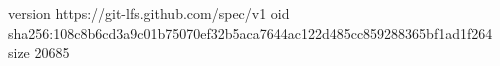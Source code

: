 version https://git-lfs.github.com/spec/v1
oid sha256:108c8b6cd3a9c01b75070ef32b5aca7644ac122d485cc859288365bf1ad1f264
size 20685
